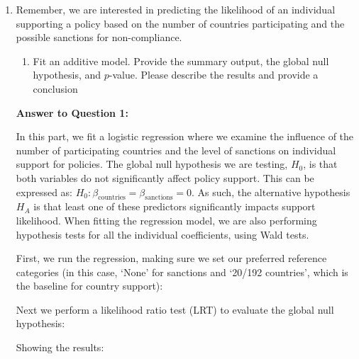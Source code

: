 \documentclass[12pt,letterpaper]{article}
\begin{document}
\begin{enumerate}
	\item
	Remember, we are interested in predicting the likelihood of an individual supporting a policy based on the number of countries participating and the possible sanctions for non-compliance.
	\begin{enumerate}
		\item [] Fit an additive model. Provide the summary output, the global null hypothesis, and $p$-value. Please describe the results and provide a conclusion
	\end{enumerate}
	
	\vspace{.25cm}
	\noindent \textbf{Answer to Question 1:}
	\vspace{.25cm}
	
	\noindent In this part, we fit a logistic regression where we examine the influence of the number of participating countries and the level of sanctions on individual support for policies. The global null hypothesis we are testing, $H_0$, is that both variables do not significantly affect policy support. This can be expressed as: $H_0: \beta_{\text{countries}} = \beta_{\text{sanctions}} = 0$. As such, the alternative hypothesis $H_A$ is that least one of these predictors significantly impacts support likelihood. When fitting the regression model, we are also performing hypothesis tests for all the individual coefficients, using Wald tests. 
	
	First, we run the regression, making sure we set our preferred reference categories (in this case, `None' for sanctions and `20/192 countries', which is the baseline for country support): 
	\vspace{.25cm}
	
	
	
	\newpage
	\noindent Next we perform a likelihood ratio test (LRT) to evaluate the global null hypothesis: 
	\vspace{.25cm}
	
	
	\vspace{.25cm}
	
	\noindent Showing the results: 
	

\end{enumerate}
\end{document}

